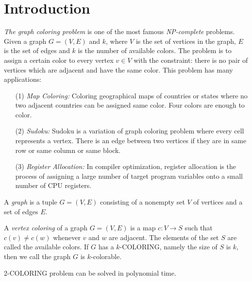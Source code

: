 \section{Introduction}
\textit{The graph coloring problem} is one of the most famous \textit{NP-complete} problems. Given a graph $G = (V, E)$ and $k$, where $V$ is the set of vertices in the graph, $E$ is the set of edges and $k$ is the number of available colors. The problem is to assign a certain color to every vertex $v \in V$ with the constraint: there is no pair of vertices which are adjacent and  have the same color.
This problem has many applications:
\begin{itemize}
    \item[(1)] \textit{Map Coloring:} Coloring geographical maps of countries or states where no two adjacent countries can be assigned same color. Four colors are enough to color.
    \item[(2)] \textit{Sudoku:} Sudoku is a variation of graph coloring problem where every cell represents a vertex. There is an edge between two vertices if they are in same row or same column or same block.
    \item[(3)] \textit{Register Allocation:} In compiler optimization, register allocation is the process of assigning a large number of target program variables onto a small number of CPU registers. \cite{example}
\end{itemize}

\begin{definition}
A \textit{graph} is a tuple $G = (V, E)$ consisting of a nonempty set $V$ of vertices and a set of edges $E$. \cite{bondy1976graph}
\end{definition}

\begin{definition}
A \textit{vertex coloring} of a graph $G = (V, E)$ is a map $c: V \longrightarrow S$ such that $c(v) \ne c(w)$ whenever $v$ and $w$ are adjacent. The elements of the set $S$ are called the available colors. If $G$ has a $k$-COLORING, namely the size of $S$ is $k$, then we call the graph $G$ is $k$-colorable.
 \cite{diestel2010graph}
\end{definition}
\begin{claim}
2-COLORING problem can be solved in polynomial time.
\end{claim}

